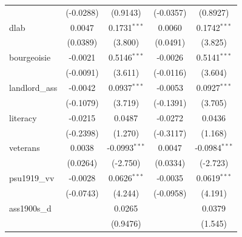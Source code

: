 \begin{table}[htbp]
\begin{tabular}{lcccc}
                                       & (-0.0288)             & (0.9143)                      & (-0.0357)            & (0.8927)\\   
      dlab                             & 0.0047                & 0.1731$^{***}$                & 0.0060               & 0.1742$^{***}$\\   
                                       & (0.0389)              & (3.800)                       & (0.0491)             & (3.825)\\   
      bourgeoisie                      & -0.0021               & 0.5146$^{***}$                & -0.0026              & 0.5141$^{***}$\\   
                                       & (-0.0091)             & (3.611)                       & (-0.0116)            & (3.604)\\   
      landlord\_ass                    & -0.0042               & 0.0937$^{***}$                & -0.0053              & 0.0927$^{***}$\\   
                                       & (-0.1079)             & (3.719)                       & (-0.1391)            & (3.705)\\   
      literacy                         & -0.0215               & 0.0487                        & -0.0272              & 0.0436\\   
                                       & (-0.2398)             & (1.270)                       & (-0.3117)            & (1.168)\\   
      veterans                         & 0.0038                & -0.0993$^{***}$               & 0.0047               & -0.0984$^{***}$\\   
                                       & (0.0264)              & (-2.750)                      & (0.0334)             & (-2.723)\\   
      psu1919\_vv                      & -0.0028               & 0.0626$^{***}$                & -0.0035              & 0.0619$^{***}$\\   
                                       & (-0.0743)             & (4.244)                       & (-0.0958)            & (4.191)\\   
      ass1900s\_d                      &                       & 0.0265                        &                      & 0.0379\\   
                                       &                       & (0.9476)                      &                      & (1.545)\\   

\end{tabular}
\end{table}
